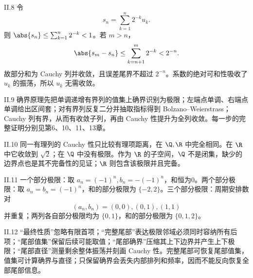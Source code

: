 \begin{solution}{II.8}
令
\[
 s_n=\sum_{k=1}^n2^{-k}u_k.
\]
则 \(\abs{s_n}\le\sum_{k=1}^n2^{-k}<1\)。若 \(m>n\)，
\[
 \abs{s_m-s_n}\le\sum_{k=n+1}^m2^{-k}<2^{-n}.
\]
故部分和为 Cauchy 列并收敛，且误差尾界不超过 \(2^{-n}\)。系数的绝对可和性吸收了 \(u_k\) 的振荡，所以 \(u_k\) 无需收敛。
\end{solution}

\begin{solution}{II.9}
确界原理先把单调递增有界列的值集上确界识别为极限；左端点单调、右端点单调给出区间套；对有界列反复二分并抽取指标得到 Bolzano--Weierstrass；Cauchy 列有界，从而有收敛子列，再由 Cauchy 性提升为全列收敛。每一步的完整证明分别见第6、10、11、13章。
\end{solution}

\begin{solution}{II.10}
同一有理列的 Cauchy 性只比较有理项距离，在 \(\Q,\R\) 中完全相同。在 \(\R\) 中它收敛到 \(\sqrt2\)；在 \(\Q\) 中没有极限。作为 \(\R\) 的子空间，\(\Q\) 不是闭集，缺少的边界点也是其不完备性的见证；\(\R\) 则包含该极限并且完备。
\end{solution}

\begin{solution}{II.11}
一个部分极限：取 \(a_n=(-1)^n,b_n=-(-1)^n\)，和恒为0。两个部分极限：取 \(a_n=b_n=(-1)^n\)，和的部分极限为 \(\{-2,2\}\)。三个部分极限：周期安排数对
\[
 (a_n,b_n)=(0,0),(0,1),(1,1)
\]
并重复；两列各自部分极限均为 \(\{0,1\}\)，和的部分极限为 \(\{0,1,2\}\)。
\end{solution}

\begin{solution}{II.12}
“最终性质”忽略有限首项；“完整尾部”表达极限邻域必须同时容纳所有后项；“尾部值集”保留后续可能取值；“尾部确界”压缩其上下边界并产生上下极限；“尾部直径”测量剩余整体振荡并刻画 Cauchy 性。完整尾部可恢复尾部值集，值集可计算确界与直径；只保留确界会丢失内部排列和频率，因而不能反向恢复全部尾部信息。
\end{solution}
